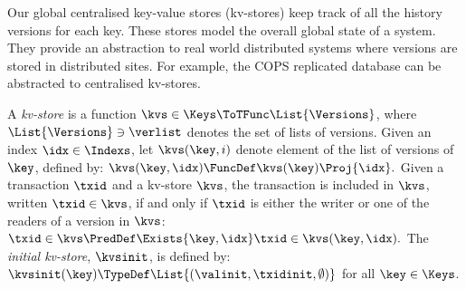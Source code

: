 Our global centralised key-value stores (kv-stores) keep track of all the history versions for each key.
These stores model the overall global state of a system.
They provide an abstraction to real world distributed systems where versions are stored in distributed sites.
For example, the COPS replicated database  can be abstracted to centralised kv-stores.

\begin{definition}[Kv-stores]
\label{def:kv-store}
A \emph{kv-store} is a function \(\kvs \in \Keys \ToTFunc \List{\Versions}\), 
where \(\List{\Versions} \ni \verlist\) denotes the set of lists of versions.
Given an index \( \idx \in \Indexs \), 
let \(\kvs(\key, i)\) denote  element of the list of versions of \(\key\), defined by:
\( \kvs(\key,\idx) \FuncDef \kvs(\key)\Proj{\idx}.  \)
Given a transaction \(\txid\) and a kv-store \( \kvs \),
the transaction is included in \( \kvs \), written \(\txid \in \kvs\),
if and only if \(\txid\) is either the writer 
or one of the readers of a version in \(\kvs\):
\( 
    \txid \in \kvs \PredDef 
    \Exists{\key,\idx} \txid \in \kvs(\key,\idx).
\)
The \emph{initial kv-store}, \(\kvsinit\), is defined by:
\(\kvsinit(\key) \TypeDef \List{(\valinit, \txidinit, \emptyset)}\) for
all \(\key \in \Keys\). 
\end{definition}



